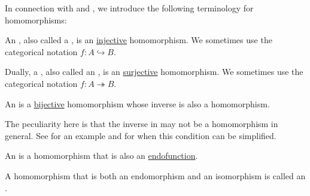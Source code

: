 \begin{definition}\label{def:first_order_homomorphism_invertibility}
  In connection with  and , we introduce the following terminology for homomorphisms:
  \begin{thmenum}
     An , also called a , is an \hyperref[def:function_invertibility/injective]{injective} homomorphism. We sometimes use the categorical notation \( f: A \hookrightarrow B \).

     Dually, a , also called an , is an \hyperref[def:function_invertibility/surjective]{surjective} homomorphism. We sometimes use the categorical notation \( f: A \twoheadrightarrow B \).

     An  is a \hyperref[def:function_invertibility/bijective]{bijective} homomorphism whose inverse is also a homomorphism.

    The peculiarity here is that the inverse in  may not be a homomorphism in general. See  for an example and  for when this condition can be simplified.

     An  is a homomorphism that is also an \hyperref[def:multi_valued_function/endofunction]{endofunction}.

     A homomorphism that is both an endomorphism and an isomorphism is called an .
  \end{thmenum}
\end{definition}

